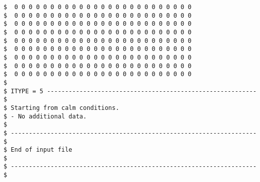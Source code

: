 \begin{verbatim}
$  0 0 0 0 0 0 0 0 0 0 0 0 0 0 0 0 0 0 0 0 0 0 0 0 0
$  0 0 0 0 0 0 0 0 0 0 0 0 0 0 0 0 0 0 0 0 0 0 0 0 0
$  0 0 0 0 0 0 0 0 0 0 0 0 0 0 0 0 0 0 0 0 0 0 0 0 0
$  0 0 0 0 0 0 0 0 0 0 0 0 0 0 0 0 0 0 0 0 0 0 0 0 0
$  0 0 0 0 0 0 0 0 0 0 0 0 0 0 0 0 0 0 0 0 0 0 0 0 0
$  0 0 0 0 0 0 0 0 0 0 0 0 0 0 0 0 0 0 0 0 0 0 0 0 0
$  0 0 0 0 0 0 0 0 0 0 0 0 0 0 0 0 0 0 0 0 0 0 0 0 0
$  0 0 0 0 0 0 0 0 0 0 0 0 0 0 0 0 0 0 0 0 0 0 0 0 0
$  0 0 0 0 0 0 0 0 0 0 0 0 0 0 0 0 0 0 0 0 0 0 0 0 0
$
$ ITYPE = 5 ---------------------------------------------------------- $
$ Starting from calm conditions.
$ - No additional data.
$
$ -------------------------------------------------------------------- $
$ End of input file                                                    $
$ -------------------------------------------------------------------- $
\end{verbatim}
